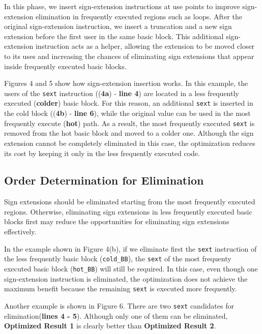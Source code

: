 In this phase, we insert sign-extension instructions at use points to improve sign-extension elimination in frequently executed regions such as loops. After the original sign-extension instruction, we insert a truncation and a new sign extension before the first user in the same basic block. This additional sign-extension instruction acts as a helper, allowing the extension to be moved closer to its uses and increasing the chances of eliminating sign extensions that appear inside frequently executed basic blocks.




Figures 4 and 5 show how sign-extension insertion works. In this example, the users of the \texttt{sext} instruction ((\textbf{4a}) - \textbf{line 4}) are located in a less frequently executed (\textbf{colder}) basic block. For this reason, an additional \texttt{sext} is inserted in the cold block ((\textbf{4b}) - \textbf{line 6}), while the original value can be used in the most frequently execute (\textbf{hot}) path. As a result, the most frequently executed \texttt{sext} is removed from the hot basic block and moved to a colder one. Although the sign extension cannot be completely eliminated in this case, the optimization reduces its cost by keeping it only in the less frequently executed code.

\subsection{Order Determination for Elimination}

Sign extensions should be eliminated starting from the most frequently executed regions. Otherwise, eliminating sign extensions in less frequently executed basic blocks first may reduce the opportunities for eliminating sign extensions effectively.

In the example shown in Figure 4(b), if we eliminate first the \texttt{sext} instruction of the less frequently basic block (\texttt{cold\_BB}), the \texttt{sext} of the most frequenty executed basic block (\texttt{hot\_BB}) will still be required. In this case, even though one sign-extension instruction is eliminated, the optimization does not achieve the maximum benefit because the remaining \texttt{sext} is executed more frequently.



Another example is shown in Figure 6. There are two \texttt{sext} candidates for elimination(\textbf{lines 4 - 5}). Although only one of them can be eliminated, \textbf{Optimized Result 1} is clearly better than \textbf{Optimized Result 2}.

